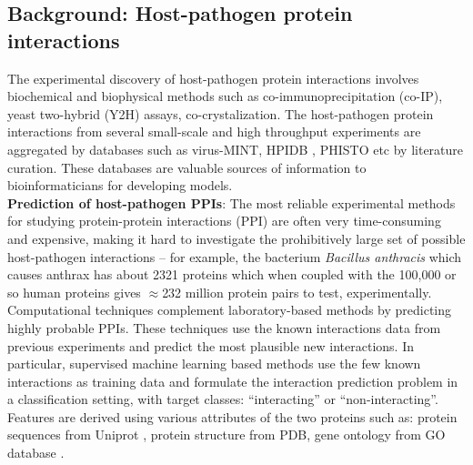 \documentclass[runningheads,a4paper]{llncs}
\begin{document}
\subsection{Background: Host-pathogen protein interactions}
The experimental discovery of host-pathogen protein interactions involves biochemical and biophysical methods such as co-immunoprecipitation (co-IP), yeast two-hybrid (Y2H) assays, co-crystalization. The host-pathogen protein interactions from several small-scale and high throughput experiments are aggregated by databases such as virus-MINT\cite{virusmint}, HPIDB \cite{hpidb}, PHISTO \cite{phisto} etc by literature curation. These databases are valuable sources of information to bioinformaticians for developing models. \\

\noindent\textbf{Prediction of host-pathogen PPIs}: The most reliable experimental methods for studying protein-protein interactions (PPI) are often very time-consuming and expensive, making it hard to investigate the prohibitively large set of possible host-pathogen interactions -- for example, the bacterium \textit{Bacillus anthracis} which causes anthrax has about 2321 proteins which when coupled with the 100,000 or so human proteins gives $\approx$232 million protein pairs to test, experimentally. Computational techniques complement laboratory-based methods by predicting highly probable PPIs. These techniques use the known interactions data from previous experiments and predict the most plausible new interactions. In particular, supervised machine learning based methods use the few known interactions as training data and formulate the interaction prediction problem in a classification setting, with target classes: ``interacting'' or ``non-interacting''. Features are derived using various attributes of the two proteins such as: protein sequences from Uniprot \cite{uniprot}, protein structure from PDB, gene ontology from GO database \cite{GO}.
\end{document}
